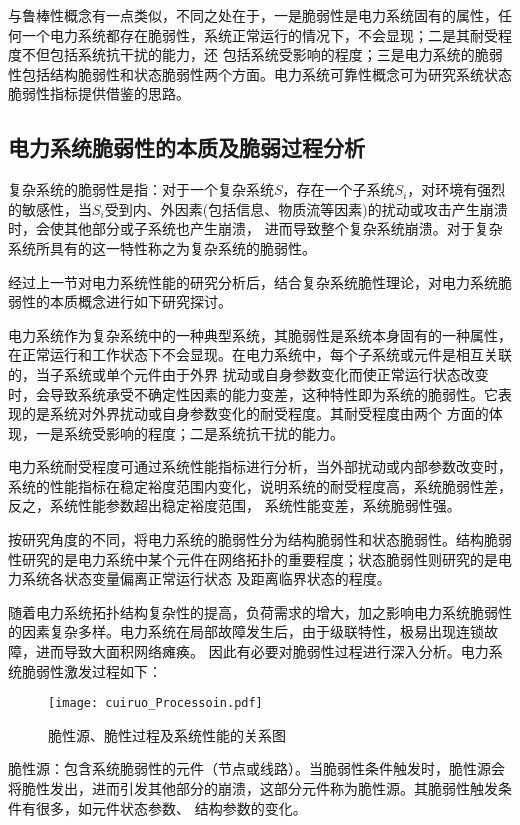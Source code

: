 与鲁棒性概念有一点类似，不同之处在于，一是脆弱性是电力系统固有的属性，任何一个电力系统都存在脆弱性，系统正常运行的情况下，不会显现；二是其耐受程度不但包括系统抗干扰的能力，还
包括系统受影响的程度；三是电力系统的脆弱性包括结构脆弱性和状态脆弱性两个方面。电力系统可靠性概念可为研究系统状态脆弱性指标提供借鉴的思路。


\subsection{电力系统脆弱性的本质及脆弱过程分析}
\label{sec:network}

复杂系统的脆弱性是指：对于一个复杂系统$S$，存在一个子系统$S_i$，对环境有强烈的敏感性，当$S_i$受到内、外因素(包括信息、物质流等因素)的扰动或攻击产生崩溃时，会使其他部分或子系统也产生崩溃，
进而导致整个复杂系统崩溃\cite{refs61}。对于复杂系统所具有的这一特性称之为复杂系统的脆弱性。

经过上一节对电力系统性能的研究分析后，结合复杂系统脆性理论，对电力系统脆弱性的本质概念进行如下研究探讨。

电力系统作为复杂系统中的一种典型系统，其脆弱性是系统本身固有的一种属性，在正常运行和工作状态下不会显现。在电力系统中，每个子系统或元件是相互关联的，当子系统或单个元件由于外界
扰动或自身参数变化而使正常运行状态改变时，会导致系统承受不确定性因素的能力变差，这种特性即为系统的脆弱性。它表现的是系统对外界扰动或自身参数变化的耐受程度。其耐受程度由两个
方面的体现，一是系统受影响的程度；二是系统抗干扰的能力。

电力系统耐受程度可通过系统性能指标进行分析，当外部扰动或内部参数改变时，系统的性能指标在稳定裕度范围内变化，说明系统的耐受程度高，系统脆弱性差，反之，系统性能参数超出稳定裕度范围，
系统性能变差，系统脆弱性强。

按研究角度的不同，将电力系统的脆弱性分为结构脆弱性和状态脆弱性。结构脆弱性研究的是电力系统中某个元件在网络拓扑的重要程度；状态脆弱性则研究的是电力系统各状态变量偏离正常运行状态
及距离临界状态的程度。

随着电力系统拓扑结构复杂性的提高，负荷需求的增大，加之影响电力系统脆弱性的因素复杂多样。电力系统在局部故障发生后，由于级联特性，极易出现连锁故障，进而导致大面积网络瘫痪。
因此有必要对脆弱性过程进行深入分析。电力系统脆弱性激发过程如下：
\begin{figure}[H] %
  \centering
  \texttt{[image: cuiruo\_Processoin.pdf]}
  \caption{脆性源、脆性过程及系统性能的关系图}
  \label{fig:procession}
\end{figure}

脆性源：包含系统脆弱性的元件（节点或线路）。当脆弱性条件触发时，脆性源会将脆性发出，进而引发其他部分的崩溃，这部分元件称为脆性源。其脆弱性触发条件有很多，如元件状态参数、
结构参数的变化。

